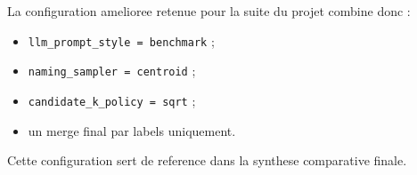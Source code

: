 La configuration amelioree retenue pour la suite du projet combine donc :
\begin{itemize}[leftmargin=*]
  \item \texttt{llm\_prompt\_style = benchmark} ;
  \item \texttt{naming\_sampler = centroid} ;
  \item \texttt{candidate\_k\_policy = sqrt} ;
  \item un merge final par labels uniquement.
\end{itemize}

Cette configuration sert de reference dans la synthese comparative finale.
